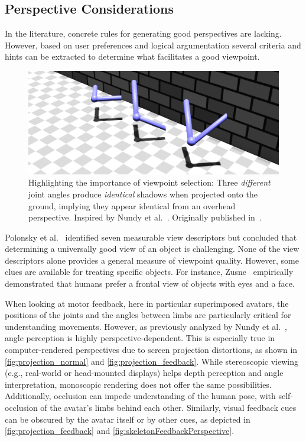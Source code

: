 \subsection*{Perspective Considerations \label{sec:considerations}}
In the literature, concrete rules for generating good perspectives are lacking. However, based on user preferences and logical argumentation several criteria and hints can be extracted to determine what facilitates a good viewpoint.

\begin{figure}[h]
	\centering
	\includegraphics[width=\linewidth]{pictures/projection_normal.png}
	\caption{Highlighting the importance of viewpoint selection: Three \emph{different} joint angles produce \emph{identical} shadows when projected onto the ground, implying they appear identical from an overhead perspective. Inspired by Nundy et al.~\cite{nundy2000wam}. Originally published in~\cite{diller2024automatic}.}
	\label{fig:projection_normal}
\end{figure}

Polonsky et al.~\cite{polonsky2005wii} identified seven measurable view descriptors but concluded that determining a universally good view of an object is challenging. None of the view descriptors alone provides a general measure of viewpoint quality. However, some clues are available for treating specific objects. For instance, Zusne~\cite{zusne1970vpf} empirically demonstrated that humans prefer a frontal view of objects with eyes and a face.

When looking at motor feedback, here in particular superimposed avatars, the positions of the joints and the angles between limbs are particularly critical for understanding movements. However, as previously analyzed by Nundy et al.~\cite{nundy2000wam}, angle perception is highly perspective-dependent. This is especially true in computer-rendered perspectives due to screen projection distortions, as shown in \autoref{fig:projection_normal} and \autoref{fig:projection_feedback}. While stereoscopic viewing (e.g., real-world or head-mounted displays) helps depth perception and angle interpretation, monoscopic rendering does not offer the same possibilities. Additionally, occlusion can impede understanding of the human pose, with self-occlusion of the avatar's limbs behind each other. Similarly, visual feedback cues can be obscured by the avatar itself or by other cues, as depicted in \autoref{fig:projection_feedback} and \autoref{fig:skeletonFeedbackPerspective}.

